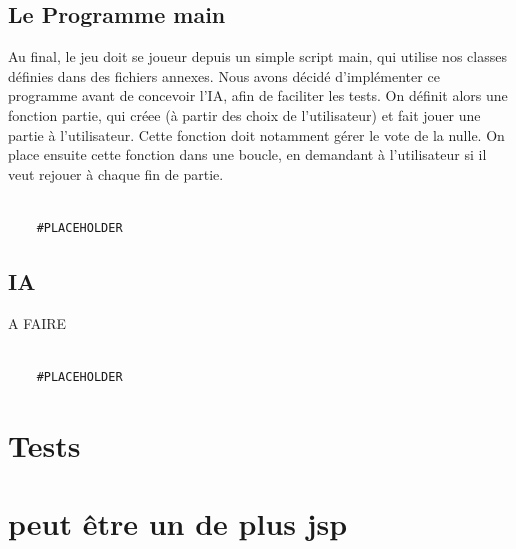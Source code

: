 \documentclass{article}
\begin{document}
\subsection{Le Programme main}
Au final, le jeu doit se joueur depuis un simple script main, qui utilise nos classes
définies dans des fichiers annexes.
Nous avons décidé d'implémenter ce programme avant de concevoir l'IA, 
afin de faciliter les tests.
On définit alors une fonction partie, qui créee (à partir des choix de l'utilisateur) et fait jouer une partie à l'utilisateur.
Cette fonction doit notamment gérer le vote de la nulle.
On place ensuite cette fonction dans une boucle, en demandant à l'utilisateur si il veut rejouer
à chaque fin de partie.
\begin{verbatim}

    #PLACEHOLDER
\end{verbatim}
\subsection{IA}
A FAIRE
\begin{verbatim}

    #PLACEHOLDER
\end{verbatim}

\section{Tests}
\section{peut être un de plus jsp}
\end{document}
